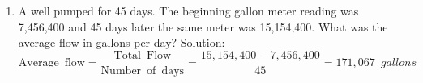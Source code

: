 \documentclass{article}
\begin{document}
\begin{enumerate}
\vspace{0.2cm}

\item A well pumped for 45 days. The beginning gallon meter reading was 7,456,400 and 45 days later the same meter was 15,154,400. What was the average flow in gallons per day?
Solution:\\
$ \mathrm{Average \enspace flow} = \dfrac{\mathrm{Total \enspace Flow}}{\mathrm{Number \enspace of \enspace days}}=\dfrac{15,154,400-7,456,400}{45}=\boxed{171,067 \enspace gallons}$
\end{enumerate}
\end{document}
